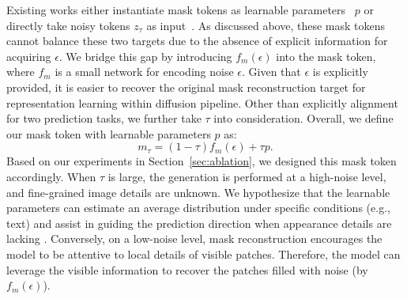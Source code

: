 Existing works either instantiate mask tokens as learnable parameters~\cite{mae,mdt} $p$ or directly take noisy tokens $z_\tau$ as input~\cite{sd_dit}. As discussed above, these mask tokens cannot balance these two targets due to the absence of explicit information for acquiring $\epsilon$. 
We bridge this gap by introducing $f_m(\epsilon)$ into the mask token, where $f_m$ is a small network for encoding noise $\epsilon$. Given that $\epsilon$ is explicitly provided, it is easier to recover the original mask reconstruction target for representation learning within diffusion pipeline. 
Other than explicitly alignment for two prediction tasks, we further take $\tau$ into consideration. 
Overall, we define our mask token with learnable parameters $p$ as:
\begin{equation}
    m_\tau = (1-\tau)f_m(\epsilon) + \tau p.
\label{eq:img_diff}
\end{equation}
Based on our experiments in Section~\ref{sec:ablation}, we designed this mask token accordingly. When $\tau$ is large, the generation is performed at a high-noise level, and fine-grained image details are unknown. We hypothesize that the learnable parameters can estimate an average distribution under specific conditions (e.g., text) and assist in guiding the prediction direction when appearance details are lacking \cite{yue2024exploring}. Conversely, on a low-noise level, mask reconstruction encourages the model to be attentive to local details of visible patches. Therefore, the model can leverage the visible information to recover the patches filled with noise (by $f_m(\epsilon)$).


